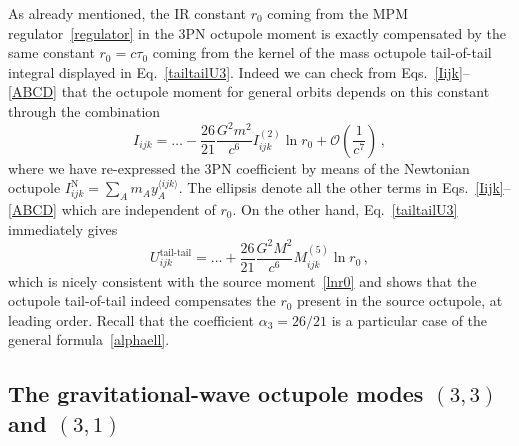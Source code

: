 \documentclass[prd,preprint,superscriptaddress,tightenlines,nofootinbib,
  eqsecnum,showpacs]{revtex4}
\begin{document}
As already mentioned, the IR constant $r_0$ coming from the MPM
regulator~\eqref{regulator} in the 3PN octupole moment is exactly
compensated by the same constant $r_0=c\tau_0$ coming from the kernel
of the mass octupole tail-of-tail integral displayed in
Eq.~\eqref{tailtailU3}. Indeed we can check from
Eqs.~\eqref{Iijk}--\eqref{ABCD} that the octupole moment for general
orbits depends on this constant through the combination
%
\begin{equation}\label{lnr0}
I_{ijk} = \dots - \frac{26}{21}\frac{G^2 m^2}{c^6}I^{(2)}_{ijk} \ln
r_0 + \mathcal{O}\left(\frac{1}{c^7}\right)\,,
\end{equation}
%
where we have re-expressed the 3PN coefficient by means of the
Newtonian octupole $I^\text{N}_{ijk} = \sum_A m_A y_A^{\langle
  ijk\rangle}$. The ellipsis denote all the other terms in
Eqs.~\eqref{Iijk}--\eqref{ABCD} which are independent of $r_0$. On the
other hand, Eq.~\eqref{tailtailU3} immediately gives
%
\begin{equation}\label{tailtaillnr0}
U_{ijk}^\text{tail-tail} = \dots + \frac{26}{21}\frac{G^2
  M^2}{c^6}M^{(5)}_{ijk} \ln r_0 \,,
\end{equation}
%
which is nicely consistent with the source moment~\eqref{lnr0} and
shows that the octupole tail-of-tail indeed compensates the $r_0$
present in the source octupole, at leading order. Recall that the
coefficient $\alpha_3=26/21$ is a particular case of the general
formula~\eqref{alphaell}.

\subsection{The gravitational-wave octupole modes  $(3,3)$ and $(3,1)$}
\label{sec:modes}
\end{document}
